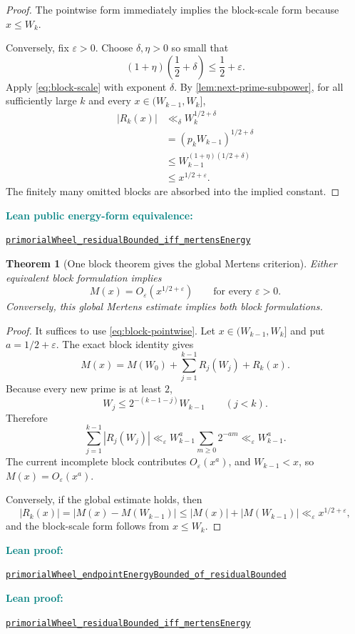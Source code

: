 \documentclass[11pt]{article}
\newtheorem{theorem}{Theorem}[section]
\theoremstyle{definition}
\newcommand{\leanxref}[3]{%
  \par\smallskip
  {\small\noindent\textcolor{teal}{\textbf{#1:}}\par
  \noindent\href{#3}{\nolinkurl{#2}}\par}
  \smallskip
}
\begin{document}
\begin{proof}
The pointwise form immediately implies the block-scale form because $x\le W_k$.

Conversely, fix $\varepsilon>0$.  Choose $\delta,\eta>0$ so small that
\[
(1+\eta)\left(\frac12+\delta\right)
\le\frac12+\varepsilon.
\]
Apply \eqref{eq:block-scale} with exponent $\delta$.  By \cref{lem:next-prime-subpower}, for all sufficiently large $k$ and every $x\in(W_{k-1},W_k]$,
\begin{align*}
|R_k(x)|
&\ll_{\delta}W_k^{1/2+\delta}\\
&=(p_kW_{k-1})^{1/2+\delta}\\
&\le W_{k-1}^{(1+\eta)(1/2+\delta)}\\
&\le x^{1/2+\varepsilon}.
\end{align*}
The finitely many omitted blocks are absorbed into the implied constant.
\end{proof}
\leanxref{Lean public energy-form equivalence}{primorialWheel_residualBounded_iff_mertensEnergy}{https://github.com/OVVO-Financial/prime-wheel-mobius/blob/main/formalization/RHLean/Analysis/PrimorialWheelMertensTransfer.lean}

\begin{theorem}[One block theorem gives the global Mertens criterion]\label{thm:block-to-global-mertens}
Either equivalent block formulation implies
\[
M(x)=O_{\varepsilon}\!\left(x^{1/2+\varepsilon}\right)
\qquad\text{for every }\varepsilon>0.
\]
Conversely, this global Mertens estimate implies both block formulations.
\end{theorem}

\begin{proof}
It suffices to use \eqref{eq:block-pointwise}.  Let $x\in(W_{k-1},W_k]$ and put $a=1/2+\varepsilon$.  The exact block identity gives
\[
M(x)=M(W_0)+\sum_{j=1}^{k-1}R_j(W_j)+R_k(x).
\]
Because every new prime is at least $2$,
\[
W_j\le2^{-(k-1-j)}W_{k-1}
\qquad(j<k).
\]
Therefore
\[
\sum_{j=1}^{k-1}|R_j(W_j)|
\ll_{\varepsilon}
W_{k-1}^{a}\sum_{m\ge0}2^{-am}
\ll_{\varepsilon}W_{k-1}^{a}.
\]
The current incomplete block contributes $O_{\varepsilon}(x^a)$, and $W_{k-1}<x$, so $M(x)=O_{\varepsilon}(x^a)$.

Conversely, if the global estimate holds, then
\[
|R_k(x)|
=|M(x)-M(W_{k-1})|
\le|M(x)|+|M(W_{k-1})|
\ll_{\varepsilon}x^{1/2+\varepsilon},
\]
and the block-scale form follows from $x\le W_k$.
\end{proof}
\leanxref{Lean proof}{primorialWheel_endpointEnergyBounded_of_residualBounded}{https://github.com/OVVO-Financial/prime-wheel-mobius/blob/main/formalization/RHLean/Analysis/PrimorialWheelMertensTransfer.lean}
\leanxref{Lean proof}{primorialWheel_residualBounded_iff_mertensEnergy}{https://github.com/OVVO-Financial/prime-wheel-mobius/blob/main/formalization/RHLean/Analysis/PrimorialWheelMertensTransfer.lean}
\end{document}
